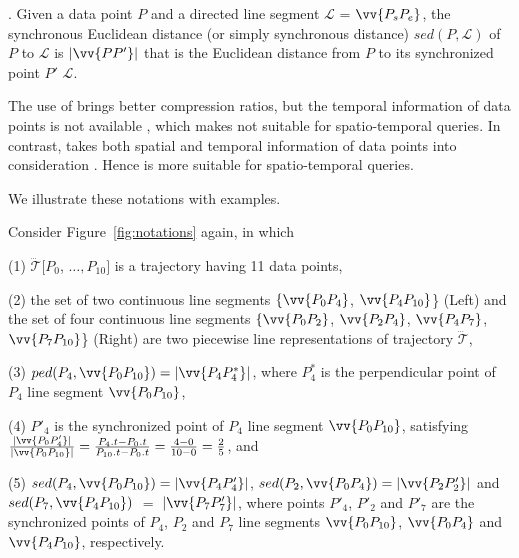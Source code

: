 . Given a data point $P$ and a directed line segment $\mathcal{L}$ = $\vv{P_{s}P_{e}}$, the synchronous Euclidean distance (or simply synchronous distance) $sed(P, \mathcal{L})$ of $P$ to $\mathcal{L}$ is $|\vv{PP'}|$ that is the Euclidean distance from $P$ to its synchronized point $P'$ \wrt $\mathcal{L}$. %

The use of \ped brings better compression ratios, but the temporal information of data points is not available \cite{Meratnia:Spatiotemporal}, which makes \ped not suitable for spatio-temporal queries.  In contrast, \sed takes both spatial and temporal information of data points into consideration \cite{Meratnia:Spatiotemporal}. Hence \sed is more suitable for spatio-temporal queries.


We illustrate these notations with examples.


\begin{example}
\label{exm-notations}
Consider Figure~\ref{fig:notations} again, in which

\sstab(1) $\dddot{\mathcal{T}}[P_0$, $\ldots, P_{10}]$ is a trajectory having 11 data points,

\sstab(2) the set of two continuous line segments $\{\vv{P_0P_4}$, $\vv{P_4P_{10}}$\} (Left) and the set of four continuous line segments $\{\vv{P_0P_2}$, $\vv{P_2P_4}$, $\vv{P_4P_7}$, $\vv{P_7P_{10}}$\} (Right) are two piecewise line representations of trajectory $\dddot{\mathcal{T}}$,

\sstab(3) $ped(P_4, \vv{P_0P_{10}})=|\vv{P_4P^*_4}|$, where $P^*_4$ is the perpendicular point of $P_4$ \wrt line segment $\vv{P_0P_{10}}$,

\sstab(4) $P'_4$ is the synchronized point of $P_4$ \wrt line segment $\vv{P_0P_{10}}$, satisfying $\frac{|\vv{P_0P'_4}|}{|\vv{P_0P_{10}}|} = \frac{P_4.t - P_0.t}{P_{10}.t-P_0.t} = \frac{4-0}{10-0}= \frac{2}{5}$, and

\sstab(5) $sed(P_4, \vv{P_0P_{10}})= |\vv{P_4P'_4}|$, $sed(P_2, \vv{P_0P_{4}})= |\vv{P_2P'_2}|$ and $sed(P_7, \vv{P_4P_{10}})$ $=$ $|\vv{P_7P'_7}|$,
where points $P'_4$, $P'_2$ and $P'_7$ are the synchronized points of $P_4$, $P_2$ and $P_7$ \wrt line segments $\vv{P_0P_{10}}$, $\vv{P_0P_{4}}$ and $\vv{P_4P_{10}}$, respectively. \eop
\end{example}


